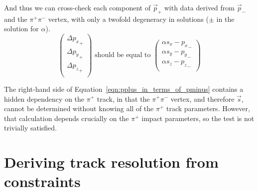 \documentclass[12pt]{article}
\begin{document}
And thus we can cross-check each component of $\vec{p}_+$ with data
derived from $\vec{p}_-$ and the $\pi^+\pi^-$ vertex, with only a twofold
degeneracy in solutions ($\pm$ in the solution for $\alpha$).
\begin{equation}
\left(\begin{array}{c}
\Delta {p_x}_+ \\
\Delta {p_y}_+ \\
\Delta {p_z}_+ \\
\end{array}\right) \mbox{ should be equal to }
\left(\begin{array}{c}
\alpha s_x - {p_x}_- \\
\alpha s_y - {p_y}_- \\
\alpha s_z - {p_z}_- \\
\end{array}\right)
\label{eqn:pplus_in_terms_of_pminus}
\end{equation}

The right-hand side of Equation~\ref{eqn:pplus_in_terms_of_pminus}
contains a hidden dependency on the $\pi^+$ track, in that the
$\pi^+\pi^-$ vertex, and therefore $\vec{s}$, cannot be determined
without knowing all of the $\pi^+$ track parameters.  However, that
calculation depends crucially on the $\pi^+$ impact parameters, so the
test is not trivially satisfied.

\section{Deriving track resolution from constraints}
\end{document}
